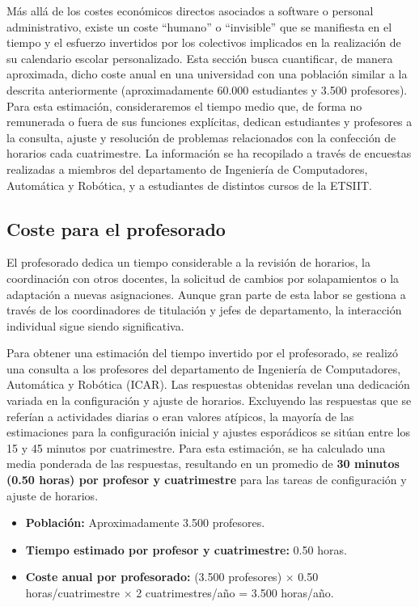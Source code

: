 Más allá de los costes económicos directos asociados a software o personal administrativo, existe un coste ``humano'' o ``invisible'' que se manifiesta en el tiempo y el esfuerzo invertidos por los colectivos implicados en la realización de su calendario escolar personalizado. Esta sección busca cuantificar, de manera aproximada, dicho coste anual en una universidad con una población similar a la descrita anteriormente (aproximadamente 60.000 estudiantes y 3.500 profesores).
\newline\newline
Para esta estimación, consideraremos el tiempo medio que, de forma no remunerada o fuera de sus funciones explícitas, dedican estudiantes y profesores a la consulta, ajuste y resolución de problemas relacionados con la confección de horarios cada cuatrimestre. La información se ha recopilado a través de encuestas realizadas a miembros del departamento de Ingeniería de Computadores, Automática y Robótica, y a estudiantes de distintos cursos de la ETSIIT.

\subsection{Coste para el profesorado}

El profesorado dedica un tiempo considerable a la revisión de horarios, la coordinación con otros docentes, la solicitud de cambios por solapamientos o la adaptación a nuevas asignaciones. Aunque gran parte de esta labor se gestiona a través de los coordinadores de titulación y jefes de departamento, la interacción individual sigue siendo significativa.

Para obtener una estimación del tiempo invertido por el profesorado, se realizó una consulta a los profesores del departamento de Ingeniería de Computadores, Automática y Robótica (ICAR). Las respuestas obtenidas revelan una dedicación variada en la configuración y ajuste de horarios. Excluyendo las respuestas que se referían a actividades diarias o eran valores atípicos, la mayoría de las estimaciones para la configuración inicial y ajustes esporádicos se sitúan entre los 15 y 45 minutos por cuatrimestre. Para esta estimación, se ha calculado una media ponderada de las respuestas, resultando en un promedio de \textbf{30 minutos (0.50 horas) por profesor y cuatrimestre} para las tareas de configuración y ajuste de horarios.

\begin{itemize}
    \item \textbf{Población:} Aproximadamente 3.500 profesores.
    \item \textbf{Tiempo estimado por profesor y cuatrimestre:} 0.50 horas.
    \item \textbf{Coste anual por profesorado:} (3.500 profesores) $\times$ 0.50 horas/cuatrimestre $\times$ 2 cuatrimestres/año = 3.500 horas/año.
\end{itemize}

